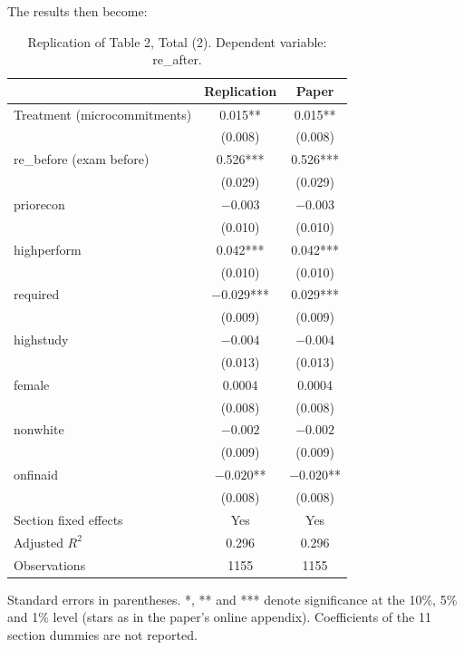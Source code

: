 \documentclass[12pt]{article}
\begin{document}
The results then become:

\begin{table}[H]
\centering
\caption{Replication of Table 2, Total (2). Dependent variable: re\_after.}
\label{tab:replication}
\begin{tabular}{lcc}
\toprule
 & Replication & Paper \\
\midrule
Treatment (microcommitments) & 0.015** & 0.015** \\
                             & (0.008) & (0.008) \\
re\_before (exam before)     & 0.526*** & 0.526*** \\
                             & (0.029) & (0.029) \\
priorecon                    & $-0.003$ & $-0.003$ \\
                             & (0.010) & (0.010) \\
highperform                  & 0.042*** & 0.042*** \\
                             & (0.010) & (0.010) \\
required                     & $-0.029$*** & 0.029*** \\
                             & (0.009) & (0.009) \\
highstudy                    & $-0.004$ & $-0.004$ \\
                             & (0.013) & (0.013) \\
female                       & 0.0004 & 0.0004 \\
                             & (0.008) & (0.008) \\
nonwhite                     & $-0.002$ & $-0.002$ \\
                             & (0.009) & (0.009) \\
onfinaid                     & $-0.020$** & $-0.020$** \\
                             & (0.008) & (0.008) \\
\midrule
Section fixed effects        & Yes & Yes \\
Adjusted $R^2$               & 0.296 & 0.296 \\
Observations                 & 1155 & 1155 \\
\bottomrule
\end{tabular}

\vspace{2pt}
{\footnotesize Standard errors in parentheses. *, ** and *** denote significance at the 10\%, 5\% and 1\% level (stars as in the paper's online appendix). Coefficients of the 11 section dummies are not reported.}
\end{table}
\end{document}
